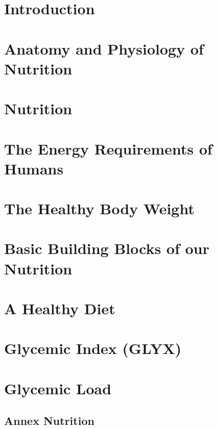 \documentclass[../main.tex]{subfiles}
\begin{document}
\chapter{Introduction}


\chapter{Anatomy and Physiology of Nutrition}


\chapter{Nutrition}

\chapter{The Energy Requirements of Humans} %


\chapter{The Healthy Body Weight} %


\chapter{Basic Building Blocks of our Nutrition}

\chapter{A Healthy Diet}


\chapter{Glycemic Index (GLYX)}



\chapter{Glycemic Load}



\section{Annex Nutrition}
\end{document}
